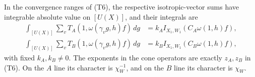 \begin{srlemma}
\label{lem:sr-theta-isotropic-unfold}
In the convergence ranges of (T6), the respective isotropic-vector
sums have integrable absolute value on \([U(X)]\), and their integrals
are
\[
 \begin{split}
 \int_{[U(X)]}\sum_v T_A(1,\omega(\gamma_vg,h)f)\,dg
     &=k_A I_{X_1,W_1}(C_A\omega(1,h)f),\\
 \int_{[U(X)]}\sum_v T_B(1,\omega(\gamma_vg,h)f)\,dg
     &=k_B I_{X_1,W_1}(C_B\omega(1,h)f),
 \end{split}
 \tag{T8}\label{eq:sr-theta-isotropic-unfold}
\]
with fixed \(k_A,k_B\ne0\). The exponents in the cone operators are
exactly \(z_A,z_B\) in (T6). On the \(A\) line its character is
\(\chi_W^{-1}\), and on the \(B\) line its character is \(\chi_W\).
\end{srlemma}

